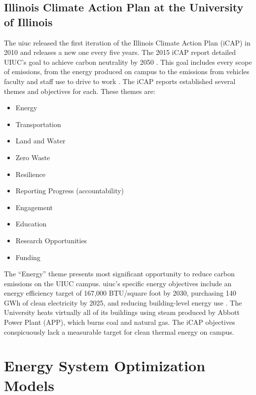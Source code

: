 \subsection{Illinois Climate Action Plan at the University of Illinois}

The \gls{uiuc} released the first iteration
of the Illinois Climate Action Plan (iCAP) in 2010 and releases a new one every five years.
The 2015 iCAP report detailed UIUC’s goal to achieve carbon neutrality by 2050
\cite{institute_for_sustainability_energy_and_environment_illinois_2015}.
This goal includes every scope of emissions, from the energy produced on campus to
the emissions from vehicles faculty and staff use to drive to work
\cite{institute_for_sustainability_energy_and_environment_illinois_2015,
institute_for_sustainability_energy_and_environment_illinois_2020}. The
iCAP reports established several themes and objectives for each. These themes are:
\begin{itemize}
  \item Energy
  \item Transportation
  \item Land and Water
  \item Zero Waste
  \item Resilience
  \item Reporting Progress (accountability)
  \item Engagement
  \item Education
  \item Research Opportunities
  \item Funding
\end{itemize}
The ``Energy'' theme presents most significant opportunity to reduce carbon emissions
on the UIUC campus. \gls{uiuc}’s specific energy objectives include an energy
efficiency target of 167,000 BTU/square foot by 2030, purchasing 140 GWh of clean
electricity by 2025, and reducing building-level energy use
\cite{institute_for_sustainability_energy_and_environment_illinois_2020}. The University
heats virtually all of its buildings using steam produced by Abbott Power Plant
(APP), which burns coal and natural gas. The iCAP objectives conspicuously lack a
measurable target for clean thermal energy on campus.

\section{Energy System Optimization Models}

